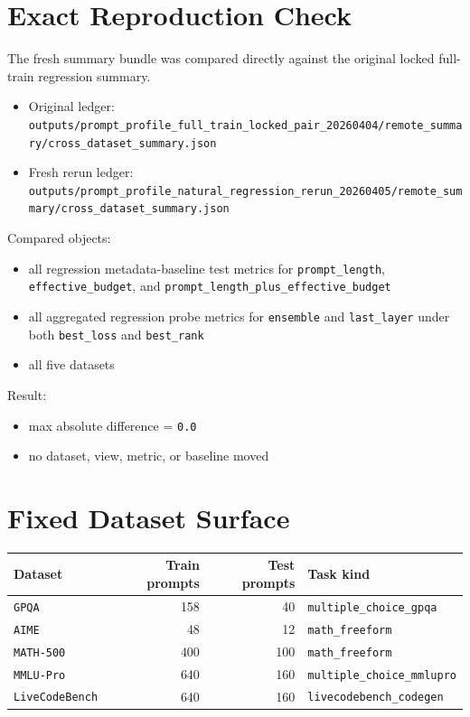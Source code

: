 \documentclass[11pt]{article}
\begin{document}
\section{Exact Reproduction Check}

The fresh summary bundle was compared directly against the original locked
full-train regression summary.

\begin{itemize}
\item Original ledger:
  \texttt{outputs/prompt\_profile\_full\_train\_locked\_pair\_20260404/remote\_summary/cross\_dataset\_summary.json}
\item Fresh rerun ledger:
  \texttt{outputs/prompt\_profile\_natural\_regression\_rerun\_20260405/remote\_summary/cross\_dataset\_summary.json}
\end{itemize}

Compared objects:
\begin{itemize}
\item all regression metadata-baseline test metrics for
  \texttt{prompt\_length}, \texttt{effective\_budget}, and
  \texttt{prompt\_length\_plus\_effective\_budget}
\item all aggregated regression probe metrics for \texttt{ensemble} and
  \texttt{last\_layer} under both \texttt{best\_loss} and \texttt{best\_rank}
\item all five datasets
\end{itemize}

Result:
\begin{itemize}
\item max absolute difference = \texttt{0.0}
\item no dataset, view, metric, or baseline moved
\end{itemize}

\section{Fixed Dataset Surface}

\begin{table}[h]
\centering
\small
\begin{tabular}{lrrl}
\toprule
Dataset & Train prompts & Test prompts & Task kind \\
\midrule
\texttt{GPQA} & 158 & 40 & \texttt{multiple\_choice\_gpqa} \\
\texttt{AIME} & 48 & 12 & \texttt{math\_freeform} \\
\texttt{MATH-500} & 400 & 100 & \texttt{math\_freeform} \\
\texttt{MMLU-Pro} & 640 & 160 & \texttt{multiple\_choice\_mmlupro} \\
\texttt{LiveCodeBench} & 640 & 160 & \texttt{livecodebench\_codegen} \\
\bottomrule
\end{tabular}
\end{table}
\end{document}
